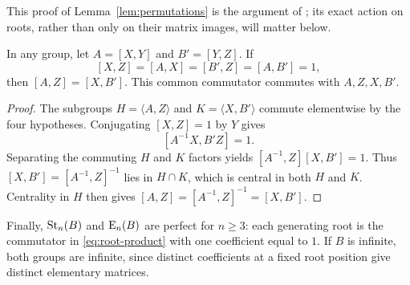 This proof of Lemma~\ref{lem:permutations} is the argument of
\cite[Lemma~6.3]{Companion}; its exact action on roots, rather than only
on their matrix images, will matter below.

\begin{lemma}\label{lem:commutator}
In any group, let $A=[X,Y]$ and $B'=[Y,Z]$. If
\[
 [X,Z]=[A,X]=[B',Z]=[A,B']=1,
\]
then $[A,Z]=[X,B']$. This common commutator commutes with
$A,Z,X,B'$.
\end{lemma}

\begin{proof}
The subgroups $H=\langle A,Z\rangle$ and $K=\langle X,B'\rangle$
commute elementwise by the four hypotheses. Conjugating $[X,Z]=1$
by $Y$ gives
\[
 [A^{-1}X,B'Z]=1.
\]
Separating the commuting $H$ and $K$ factors yields
$[A^{-1},Z][X,B']=1$. Thus $[X,B']=[A^{-1},Z]^{-1}$ lies in
$H\cap K$, which is central in both $H$ and $K$. Centrality in $H$
then gives $[A,Z]=[A^{-1},Z]^{-1}=[X,B']$.
\end{proof}

Finally, $\operatorname{St}_n(B)$ and $\operatorname{E}_n(B)$ are perfect for $n\ge3$:
each generating root is the commutator in \eqref{eq:root-product}
with one coefficient equal to $1$. If $B$ is infinite, both groups are
infinite, since distinct coefficients at a fixed root position give
distinct elementary matrices.
